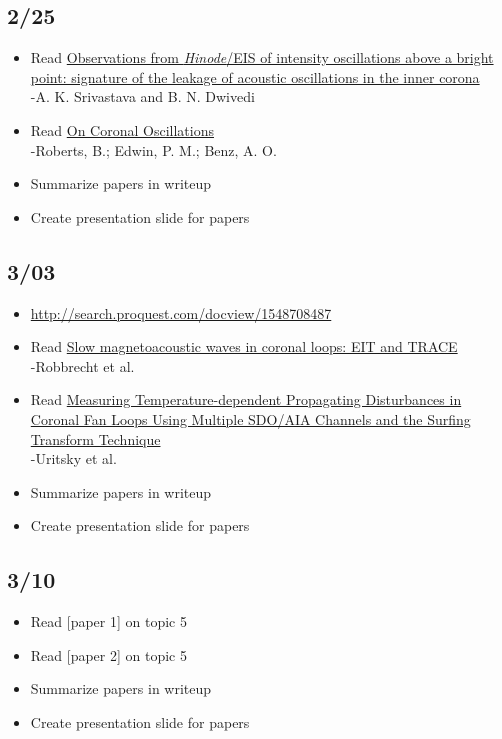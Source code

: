 \documentclass[12pt]{article}
\begin{document}
\subsection*{2/25}
\begin{itemize}
    \item Read
        \href{http://cdsads.u-strasbg.fr/abs/2010MNRAS.405.2317S}
        {\textcolor{cobalt}{Observations from \emph{Hinode}/EIS of
        intensity oscillations above a bright point: signature of the
        leakage of acoustic oscillations in the inner corona}}\\
        -A. K. Srivastava and B. N. Dwivedi
    \item Read
        \href{http://cdsads.u-strasbg.fr/abs/1984ApJ...279..857R}
        {\textcolor{cobalt}{On Coronal Oscillations}}\\
        -Roberts, B.; Edwin, P. M.; Benz, A. O.
    \item Summarize papers in writeup
    \item Create presentation slide for papers
\end{itemize}

\subsection*{3/03}
\begin{itemize}
    \item \url{http://search.proquest.com/docview/1548708487}
    \item Read
        \href{http://cdsads.u-strasbg.fr/abs/2001A%26A...370..591R}
        {\textcolor{cobalt}{Slow magnetoacoustic waves in coronal loops:
        EIT and TRACE}}\\
        -Robbrecht et al.
    \item Read
        \href{http://cdsads.u-strasbg.fr/abs/2013ApJ...778...26U}
        {\textcolor{cobalt}{Measuring Temperature-dependent
        Propagating Disturbances in Coronal Fan Loops
        Using Multiple SDO/AIA Channels and the Surfing Transform Technique}}\\
        -Uritsky et al.
    \item Summarize papers in writeup
    \item Create presentation slide for papers
\end{itemize}

\subsection*{3/10}
\begin{itemize}
    \item Read [paper 1] on topic 5
    \item Read [paper 2] on topic 5
    \item Summarize papers in writeup
    \item Create presentation slide for papers
\end{itemize}
\end{document}
